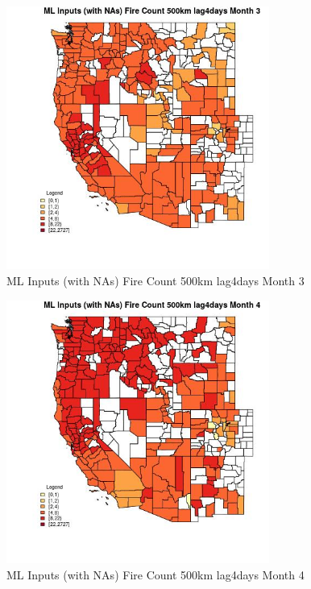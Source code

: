 \clearpage 

\begin{figure} 
\centering  
\includegraphics[width=0.77\textwidth]{Code_Outputs/Report_ML_input_PM25_Step4_part_f_de_duplicated_aves_prioritize_24hr_obswNAs_CountyFire_Count_500km_lag4daysmedianMonth3.jpg} 
\caption{\label{fig:Report_ML_input_PM25_Step4_part_f_de_duplicated_aves_prioritize_24hr_obswNAsCountyFire_Count_500km_lag4daysmedianMonth3}ML Inputs (with NAs) Fire Count 500km lag4days Month 3} 
\end{figure} 
 

\begin{figure} 
\centering  
\includegraphics[width=0.77\textwidth]{Code_Outputs/Report_ML_input_PM25_Step4_part_f_de_duplicated_aves_prioritize_24hr_obswNAs_CountyFire_Count_500km_lag4daysmedianMonth4.jpg} 
\caption{\label{fig:Report_ML_input_PM25_Step4_part_f_de_duplicated_aves_prioritize_24hr_obswNAsCountyFire_Count_500km_lag4daysmedianMonth4}ML Inputs (with NAs) Fire Count 500km lag4days Month 4} 
\end{figure} 
 

